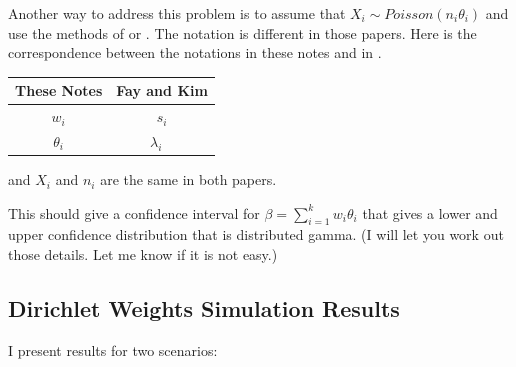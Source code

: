 \documentclass{article}
\begin{document}
Another way to address this problem is to assume that $X_i \sim Poisson( n_i \theta_i)$ and use the methods
of \citet{FayF:1997} or \citet{FayK:2017}.
The notation is different in those papers. Here is the correspondence between the notations in these notes and in \citet{FayK:2017}.

\begin{tabular}{cc}
These Notes & Fay and Kim  \\ \hline
$w_i$     & $s_i$ \\
$\theta_i$ & $\lambda_i$ \
\end{tabular}

and $X_i$ and $n_i$ are the same in both papers. 


This should give a confidence interval for $\beta=\sum_{i=1}^{k} w_i \theta_i$
that gives a lower and upper confidence distribution that is distributed gamma. (I will let you work out those details. Let me know if it is not easy.)

\subsection{Dirichlet Weights Simulation Results}

I present results for two scenarios:
\end{document}
